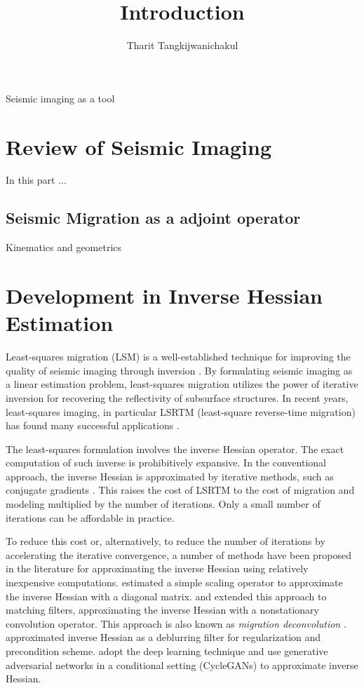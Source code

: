 \title{Introduction}
\author{Tharit Tangkijwanichakul}
\label{ch:chapter-intro}

\maketitle

Seismic imaging as a tool

\section{Review of Seismic Imaging}

In this part ...

\subsection{Seismic Migration as a adjoint operator}

Kinematics and geometrics


\section{Development in Inverse Hessian Estimation}

Least-squares migration (LSM) is a well-established technique for improving the quality of seismic imaging through inversion \cite[]{nemeth,ronen}. By formulating seismic imaging as a linear estimation problem, least-squares migration utilizes the power of iterative inversion for recovering the reflectivity of subsurface structures. In recent years, least-squares imaging, in particular LSRTM (least-square reverse-time migration) has found many successful applications \cite[]{dai,wang,wong}.

The least-squares formulation involves the inverse Hessian operator. The exact computation of such inverse is prohibitively expansive. In the conventional approach, the inverse Hessian is approximated by iterative methods, such as conjugate gradients \cite[]{tarantola,sun,xue}. This raises the cost of LSRTM to the cost of migration and modeling multiplied by the number of iterations. Only a small number of iterations can be affordable in practice. 

To reduce this cost or, alternatively, to reduce the number of iterations by accelerating the iterative convergence, a number of methods have been proposed in the literature for approximating the inverse Hessian using relatively inexpensive computations. \cite{rickett} estimated a simple scaling operator to approximate the inverse Hessian with a diagonal matrix. \cite{guitton} and \cite{greer} extended this approach to matching filters, approximating the inverse Hessian with a nonstationary convolution operator. This approach is also known as \emph{migration deconvolution} \cite[]{hu2001,yu2006}. \cite{aoki} approximated inverse Hessian as a deblurring filter for regularization and precondition scheme. \cite{kaur} adopt the deep learning technique and use generative adversarial networks in a conditional setting (CycleGANs) to approximate inverse Hessian.



